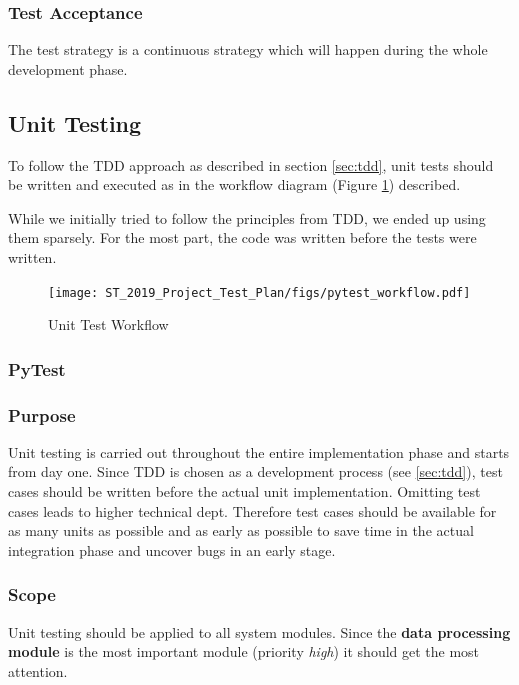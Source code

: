 \documentclass[a4paper]{article}
\begin{document}
\subsubsection*{Test Acceptance}
The test strategy is a continuous strategy which will happen during the whole development phase.




\clearpage
\subsection{Unit Testing}
\label{sec:unit-tests}
To follow the TDD approach as described in section \ref{sec:tdd}, unit tests should be written and executed as in the workflow diagram (Figure \ref{fig:pytest-workflow}) described.

While we initially tried to follow the principles from TDD, we ended up using them sparsely. For the most part, the code was written before the tests were written.

\begin{figure}[H]
\centering
    \texttt{[image: ST\_2019\_Project\_Test\_Plan/figs/pytest\_workflow.pdf]}
    \caption{Unit Test Workflow}
    \label{fig:pytest-workflow}
\end{figure}


\subsubsection{PyTest}
\label{sec:pytest}
\subsubsection*{Purpose}
Unit testing is carried out throughout the entire implementation phase and starts from day one. Since TDD is chosen as a development process (see \ref{sec:tdd}), test cases should be written before the actual unit implementation. Omitting test cases leads to higher technical dept. Therefore test cases should be available for as many units as possible and as early as possible to save time in the actual integration phase and uncover bugs in an early stage.

\subsubsection*{Scope}
Unit testing should be applied to all system modules. Since the \textbf{data processing module} is the most important module (priority \textit{high}) it should get the most attention.
\end{document}
